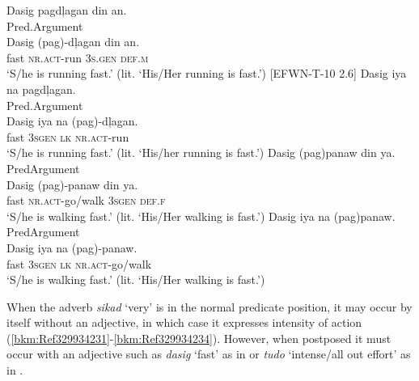 \ea
\label{bkm:Ref246298440}
Dasig  pagdļagan  din  an. \\\smallskip
Pred.\hspace{.3cm}Argument \\
\gll Dasig  (pag)-dļagan  din  an. \\
fast  \textsc{nr.act}-run  3\textsc{s.gen}  \textsc{def.m} \\
\glt ‘S/he is running fast.’ (lit. ‘His/Her running is fast.’) [EFWN-T-10 2.6]
\z
\ea
Dasig  iya  na  pagdļagan. \\\smallskip
Pred.\hspace{.3cm}Argument \\
\gll Dasig  iya  na  (pag)-dļagan. \\
fast  \textsc{3sgen}  \textsc{lk}  \textsc{nr.act-}run \\
\glt ‘S/he is running fast.’ (lit. ‘His/her running is fast.’)
\z
\ea
Dasig  (pag)panaw  din  ya. \\\smallskip
Pred\hspace{.3cm}Argument \\
\gll Dasig  (pag)-panaw  din  ya. \\
fast  \textsc{nr.act-}go/walk  \textsc{3sgen}  \textsc{def.f} \\
\glt ‘S/he is walking fast.' (lit. ‘His/Her walking is fast.’)
\z
\ea
Dasig  iya  na  (pag)panaw. \\\smallskip
Pred\hspace{.3cm}Argument \\
\gll Dasig  iya  na  (pag)-panaw. \\
fast  \textsc{3sgen}  \textsc{lk}  \textsc{nr.act-}go/walk \\
\glt  ‘S/he is walking fast.' (lit. ‘His/Her walking is fast.’) \\
\z

When the adverb \textit{sikad} ‘very’ is in the normal predicate position, it may occur by itself without an adjective, in which case it expresses intensity of action (\ref{bkm:Ref329934231}-\ref{bkm:Ref329934234}). However, when postposed it must occur with an adjective such as \textit{dasig} `fast' as in  or \textit{tudo} ‘intense/all out effort’ as in .

